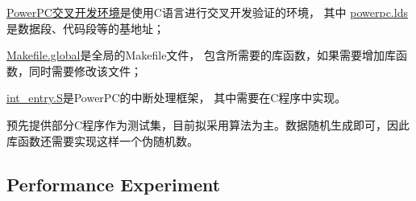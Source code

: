 \documentclass[hyperref,UTF8]{ctexart}
\theoremstyle{definition}
\theoremstyle{remark}
\numberwithin{equation}{subsection}
\begin{document}
	\href{https://github.com/Turf1013/PPC_AutoTool/tree/master/PPC}{PowerPC交叉开发环境}是使用C语言进行交叉开发验证的环境，
	其中
	\href{https://github.com/Turf1013/PPC_AutoTool/blob/master/PPC/global/powerpc.lds}{powerpc.lds}是数据段、代码段等的基地址；
	
	\href{https://github.com/Turf1013/PPC_AutoTool/blob/master/PPC/global/Makefile.global}{Makefile.global}是全局的Makefile文件，
	包含所需要的库函数，如果需要增加库函数，同时需要修改该文件；
	
	\href{https://github.com/Turf1013/PPC_AutoTool/blob/master/PPC/global/int_entry.S}{int\_entry.S}是PowerPC的中断处理框架，
	其中需要在C程序中实现。
	
	预先提供部分C程序作为测试集，目前拟采用算法为主。数据随机生成即可，因此库函数还需要实现这样一个伪随机数。

\subsection{Performance Experiment}
	
\end{document}
